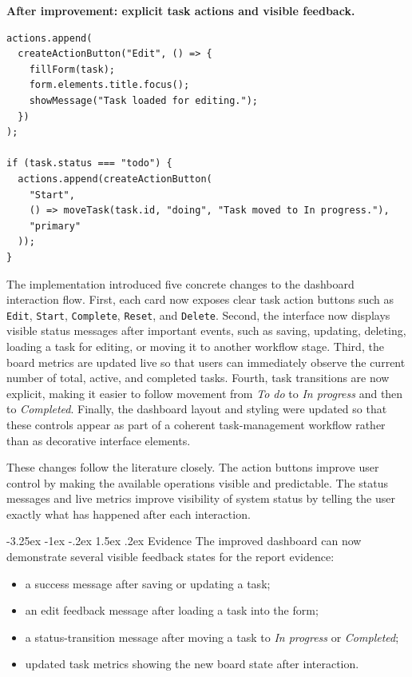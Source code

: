 \documentclass[12pt,a4paper]{article}
\makeatletter
\renewcommand\subsection{\@startsection{subsection}{2}{\z@}%
  {-3.25ex \@plus -1ex \@minus -.2ex}%
  {1.5ex \@plus .2ex}%
  {\normalfont\bfseries\fontsize{12}{14}\selectfont}}
\makeatother
\begin{document}
\noindent\textbf{After improvement: explicit task actions and visible feedback.}
{\footnotesize
\begin{verbatim}
actions.append(
  createActionButton("Edit", () => {
    fillForm(task);
    form.elements.title.focus();
    showMessage("Task loaded for editing.");
  })
);

if (task.status === "todo") {
  actions.append(createActionButton(
    "Start",
    () => moveTask(task.id, "doing", "Task moved to In progress."),
    "primary"
  ));
}
\end{verbatim}
}

The implementation introduced five concrete changes to the dashboard interaction flow. First, each card now exposes clear task action buttons such as \texttt{Edit}, \texttt{Start}, \texttt{Complete}, \texttt{Reset}, and \texttt{Delete}. Second, the interface now displays visible status messages after important events, such as saving, updating, deleting, loading a task for editing, or moving it to another workflow stage. Third, the board metrics are updated live so that users can immediately observe the current number of total, active, and completed tasks. Fourth, task transitions are now explicit, making it easier to follow movement from \textit{To do} to \textit{In progress} and then to \textit{Completed}. Finally, the dashboard layout and styling were updated so that these controls appear as part of a coherent task-management workflow rather than as decorative interface elements.

These changes follow the literature closely. The action buttons improve user control by making the available operations visible and predictable. The status messages and live metrics improve visibility of system status by telling the user exactly what has happened after each interaction.

\subsection{Evidence}
The improved dashboard can now demonstrate several visible feedback states for the report evidence:

\begin{itemize}
\item a success message after saving or updating a task;
\item an edit feedback message after loading a task into the form;
\item a status-transition message after moving a task to \textit{In progress} or \textit{Completed};
\item updated task metrics showing the new board state after interaction.
\end{itemize}
\end{document}
